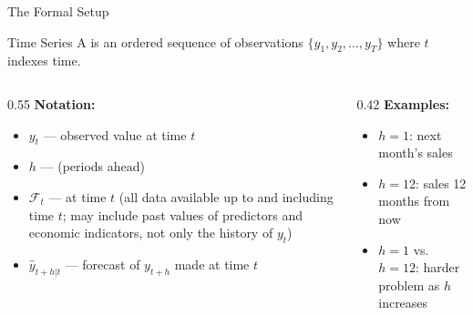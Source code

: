 \documentclass[aspectratio=169, 11pt]{beamer}
\begin{document}

\begin{frame}{The Formal Setup}
  \begin{definitionbox}{Time Series}
    A  is an ordered sequence of observations
    $\{y_1, y_2, \ldots, y_T\}$ where $t$ indexes time.
  \end{definitionbox}
  \vspace{0.3cm}
  \begin{columns}[T]
    \begin{column}{0.55\textwidth}
      \textbf{Notation:}
      \begin{itemize}
        \item $y_t$ --- observed value at time $t$
        \item $h$ ---  (periods ahead)
        \item $\mathcal{F}_t$ ---  at time $t$
              (all data available up to and including time $t$;
              may include past values of predictors and economic indicators,
              not only the history of $y_t$)
        \item $\hat{y}_{t+h|t}$ --- forecast of $y_{t+h}$ made at time $t$
      \end{itemize}
    \end{column}
    \begin{column}{0.42\textwidth}
      \textbf{Examples:}
      \begin{itemize}
        \item $h=1$: next month's sales
        \item $h=12$: sales 12 months from now
        \item $h=1$ vs.\ $h=12$: harder problem as $h$ increases
      \end{itemize}
      \vspace{0.2cm}
    \end{column}
  \end{columns}
\end{frame}
\end{document}
